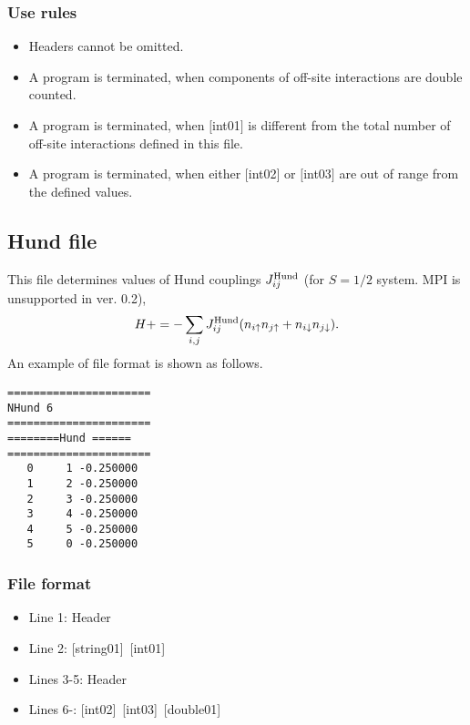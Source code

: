 \subsubsection{Use rules}
\begin{itemize}
\item Headers cannot be omitted. 
\item A program is terminated, when components of off-site interactions are double counted.
\item A program is terminated, when $[$int01$]$ is different from the total number of off-site interactions defined in this file.
\item A program is terminated, when either $[$int02$]$ or $[$int03$]$ are out of range from the defined values.
\end{itemize}

\newpage
\subsection{Hund file}
This file determines values of Hund couplings $J_{ij}^{\rm Hund}$ {(for $S=1/2$ system. MPI is unsupported in ver. 0.2)},
\begin{equation}
H+=-\sum_{i,j}J_{ij}^{\rm Hund} (n_{i\uparrow}n_{j\uparrow}+n_{i\downarrow}n_{j\downarrow}).
\end{equation}
An example of file format is shown as follows.

\begin{minipage}{12.5cm}
\begin{screen}
\begin{verbatim}
====================== 
NHund 6  
====================== 
========Hund ====== 
====================== 
   0     1 -0.250000
   1     2 -0.250000
   2     3 -0.250000
   3     4 -0.250000
   4     5 -0.250000
   5     0 -0.250000
\end{verbatim}
\end{screen}
\end{minipage}

\subsubsection{File format}
 \begin{itemize}
   \item  Line 1:  Header
   \item  Line 2:   [string01]~[int01]
   \item  Lines 3-5:  Header
   \item  Lines 6-: 
   [int02]~[int03]~[double01] 
  \end{itemize}
